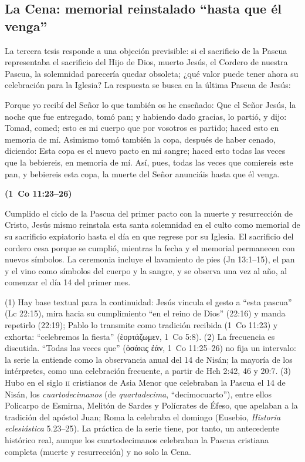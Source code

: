 \documentclass[11pt,letterpaper]{article}
\newcommand{\grc}[1]{\foreignlanguage{ancientgreek}{#1}}
\newcommand{\fuente}[1]{\par\hfill{\upshape\bfseries\small\textcolor{tierraroja}{#1}}}
\begin{document}
\subsection{La Cena: memorial reinstalado ``hasta que él venga''}
La tercera tesis responde a una objeción previsible: si el sacrificio de la Pascua representaba el sacrificio del Hijo de Dios, muerto Jesús, el Cordero de nuestra Pascua, la solemnidad parecería quedar obsoleta; ¿qué valor puede tener ahora su celebración para la Iglesia? La respuesta se busca en la última Pascua de Jesús:

\begin{cita}Porque yo recibí del Señor lo que también os he enseñado: Que el Señor Jesús, la noche que fue entregado, tomó pan; y habiendo dado gracias, lo partió, y dijo: Tomad, comed; esto es mi cuerpo que por vosotros es partido; haced esto en memoria de mí. Asimismo tomó también la copa, después de haber cenado, diciendo: Esta copa es el nuevo pacto en mi sangre; haced esto todas las veces que la bebiereis, en memoria de mí. Así, pues, todas las veces que comiereis este pan, y bebiereis esta copa, la muerte del Señor anunciáis hasta que él venga.\fuente{(1~Co 11:23--26)}\end{cita}

Cumplido el ciclo de la Pascua del primer pacto con la muerte y resurrección de Cristo, Jesús mismo reinstala esta santa solemnidad en el culto como memorial de su sacrificio expiatorio hasta el día en que regrese por su Iglesia. El sacrificio del cordero cesa porque se cumplió, mientras la fecha y el memorial permanecen con nuevos símbolos. La ceremonia incluye el lavamiento de pies (Jn 13:1--15), el pan y el vino como símbolos del cuerpo y la sangre, y se observa una vez al año, al comenzar el día 14 del primer mes.

\begin{nota}[Precisión]
(1) Hay base textual para la continuidad: Jesús vincula el gesto a ``esta pascua'' (Lc 22:15), mira hacia su cumplimiento ``en el reino de Dios'' (22:16) y manda repetirlo (22:19); Pablo lo transmite como tradición recibida (1~Co 11:23) y exhorta: ``celebremos la fiesta'' (\grc{ἑορτάζωμεν}, 1~Co 5:8). (2) La frecuencia es discutida. ``Todas las veces que'' (\grc{ὁσάκις ἐάν}, 1~Co 11:25--26) no fija un intervalo: la serie la entiende como la observancia anual del 14 de Nisán; la mayoría de los intérpretes, como una celebración frecuente, a partir de Hch 2:42, 46 y 20:7. (3) Hubo en el siglo \textsc{ii} cristianos de Asia Menor que celebraban la Pascua el 14 de Nisán, los \emph{cuartodecimanos} (de \emph{quartadecima}, ``decimocuarto''), entre ellos Policarpo de Esmirna, Melitón de Sardes y Polícrates de Éfeso, que apelaban a la tradición del apóstol Juan; Roma la celebraba el domingo (Eusebio, \emph{Historia eclesiástica} 5.23--25). La práctica de la serie tiene, por tanto, un antecedente histórico real, aunque los cuartodecimanos celebraban la Pascua cristiana completa (muerte y resurrección) y no solo la Cena.
\end{nota}
\end{document}
